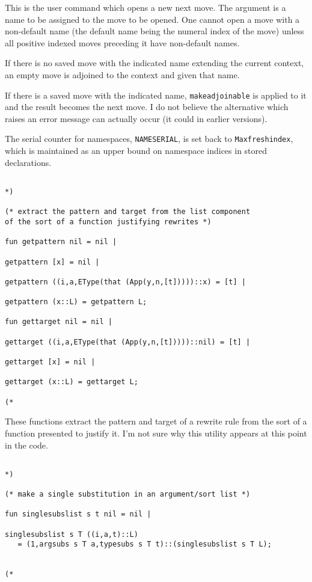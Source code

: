 \documentclass{article}
\begin{document}
This is the user command which opens a new next move.  The argument is a name to be assigned to the move to be opened.  One cannot open a move
with a non-default name (the default name being the numeral index of the move) unless all positive indexed moves preceding it have non-default names.

If there is no saved move with the indicated name extending the current context, an empty move is adjoined to the context and given that name.

If there is a saved move with the indicated name, {\tt makeadjoinable} is applied to it and the result becomes the next move.  I do not believe
the alternative which raises an error message can actually occur (it could in earlier versions).

The serial counter for namespaces, {\tt NAMESERIAL}, is set back to {\tt Maxfreshindex}, which is maintained as an upper bound on namespace indices in stored declarations.

\begin{verbatim}

*)

(* extract the pattern and target from the list component 
of the sort of a function justifying rewrites *)

fun getpattern nil = nil |

getpattern [x] = nil |

getpattern ((i,a,EType(that (App(y,n,[t]))))::x) = [t] |

getpattern (x::L) = getpattern L;

fun gettarget nil = nil |

gettarget ((i,a,EType(that (App(y,n,[t]))))::nil) = [t] |

gettarget [x] = nil |

gettarget (x::L) = gettarget L;

(*

\end{verbatim}

These functions extract the pattern and target of a rewrite rule from the sort of a function presented to justify it.  I'm not sure why this utility appears at this point in the code.

\begin{verbatim}

*)

(* make a single substitution in an argument/sort list *)

fun singlesubslist s t nil = nil |

singlesubslist s T ((i,a,t)::L) 
   = (1,argsubs s T a,typesubs s T t)::(singlesubslist s T L);


(*

\end{verbatim}
\end{document}
